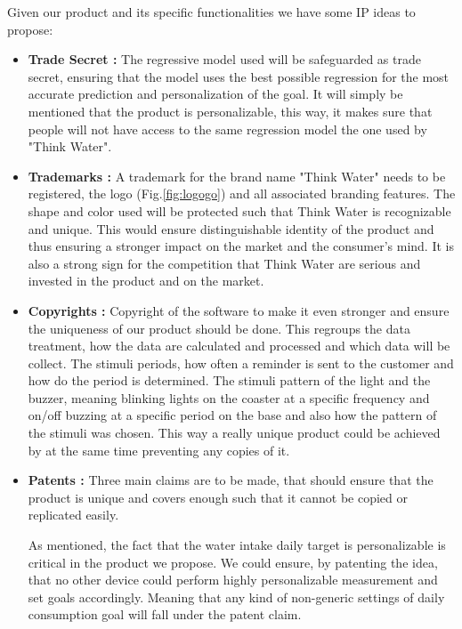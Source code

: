 \documentclass{article}
\begin{document}
Given our product and its specific functionalities we have some IP  ideas to propose:
\begin{itemize}
    \item \textbf{Trade Secret :}
    The regressive model used will be safeguarded as trade secret, ensuring that the model uses the best possible regression for the most accurate prediction and personalization of the goal. It will simply be  mentioned that the product is personalizable, this way, it makes sure that people will not have access to the same regression model the one used by "Think Water".
    \item \textbf{Trademarks :}
    A trademark for the brand name "Think Water" needs to be registered, the logo (Fig.\ref{fig:logogo}) and all associated branding features. The shape and color used will be protected such that Think Water is recognizable and unique. This would ensure distinguishable identity of the product and thus ensuring a stronger impact on the market and the consumer’s mind. It is also a strong sign for the competition that Think Water are serious and invested in the product and on the market.
    \item \textbf{Copyrights :}
    Copyright of the software to make it even stronger and ensure the uniqueness of our product should be done. This regroups the data treatment, how the data are calculated and processed and which data will be collect. The stimuli periods, how often a reminder is sent to the customer and how do the period is determined. The stimuli pattern of the light and the buzzer, meaning blinking lights on the coaster at a specific frequency and on/off buzzing at a specific period on the base and also how the pattern of the stimuli was chosen. This way a really unique product could be achieved by at the same time preventing any copies of it.
    \item \textbf{Patents :}
    Three main claims are to be made, that should ensure that the product is unique and covers enough such that it cannot be copied or replicated easily.\vspace{0.2cm}
   
    As mentioned, the fact that the water intake daily target is personalizable is critical in the product we propose. We could ensure, by patenting the idea, that no other device could perform highly personalizable measurement and set goals accordingly. Meaning that any kind of non-generic settings of daily consumption goal will fall under the patent claim. \vspace{0.2cm}
    

\end{itemize}
\end{document}
